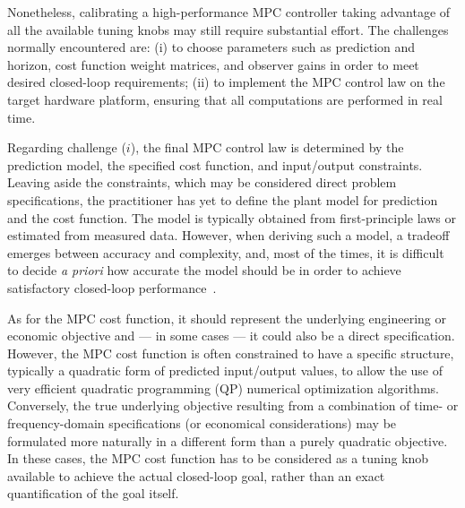 \documentclass{article}
\begin{document}
Nonetheless, calibrating a high-performance MPC controller taking advantage of all the available tuning knobs may still require substantial effort. The challenges normally encountered are: (i) to choose parameters such as prediction and horizon, cost function weight matrices, and observer gains in order to meet desired closed-loop requirements; (ii) to implement the MPC control law on the target hardware platform, ensuring that all computations are performed in real time.

Regarding challenge ($i$),  the final MPC control law is determined by the prediction model, the specified  cost function, and input/output constraints. 
Leaving  aside the constraints, which may be considered direct problem specifications, the practitioner has yet to define the plant model for prediction and the cost function. The model is typically obtained from first-principle laws or estimated from measured data. However, when deriving such a model, a tradeoff emerges between accuracy and complexity, and, most of the times, it is difficult  to decide \emph{a priori} how accurate the model should be in order to achieve  satisfactory closed-loop performance~\citep{FoPiToSa2016,PiFoBe2017}. 
% 

As for the MPC cost function, it should represent the underlying engineering or economic objective and --- in some cases --- it could also be a direct specification. However, the MPC cost function is often constrained to have a specific structure, typically a quadratic form of predicted input/output values, to allow the use of very efficient  quadratic programming (QP) numerical optimization
algorithms. Conversely, the true underlying objective resulting from a combination of time- or frequency-domain specifications (or economical considerations) may be formulated more naturally in a different form than a purely quadratic objective. In these cases, the MPC cost function has to be considered as a tuning knob available to achieve the actual closed-loop goal, rather than an exact quantification of the goal itself.
 
\end{document}
